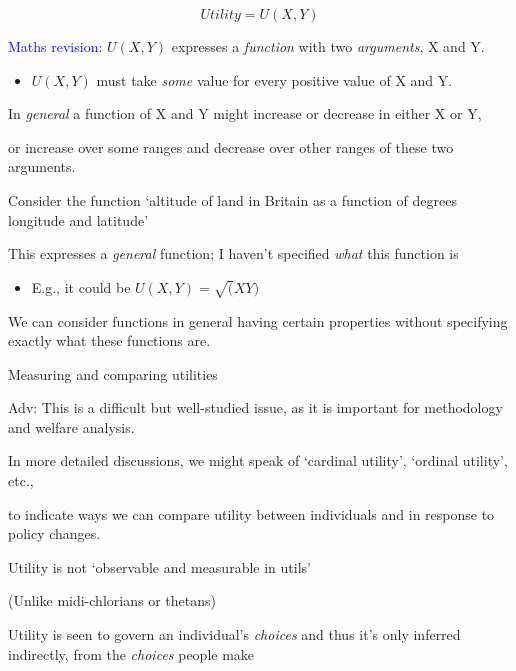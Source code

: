 \documentclass[table]{beamer}
\providecommand{\tightlist}{%
  \setlength{\itemsep}{0pt}\setlength{\parskip}{0pt}}
\begin{document}
\begin{frame}

\[Utility = U(X,Y)\]

\bigskip

\textcolor{blue}{Maths revision}: \(U(X,Y)\) expresses a \emph{function}
with two \emph{arguments}, X and Y.

\begin{itemize}
\tightlist
\item
  \(U(X,Y)\) must take \emph{some} value for every positive value of X
  and Y.
\end{itemize}

In \emph{general} a function of X and Y might increase or decrease in
either X or Y,

or increase over some ranges and decrease over other ranges of these two
arguments.

Consider the function `altitude of land in Britain as a function of
degrees longitude and latitude'

This expresses a \emph{general} function; I haven't specified
\emph{what} this function is

\begin{itemize}
\tightlist
\item
  E.g., it could be \(U(X,Y)=\sqrt(XY)\)
\end{itemize}

We can consider functions in general having certain properties without
specifying exactly what these functions are.

\begin{block}{Measuring and comparing utilities}

Adv: This is a difficult but well-studied issue, as it is important for
methodology and welfare analysis.

In more detailed discussions, we might speak of `cardinal utility',
`ordinal utility', etc.,

to indicate ways we can compare utility between individuals and in
response to policy changes.

Utility is not `observable and measurable in utils'

(Unlike midi-chlorians or thetans)

\bigskip

Utility is seen to govern an individual's \emph{choices} and thus it's
only inferred indirectly, from the \emph{choices} people make

\end{block}

\end{frame}
\end{document}
